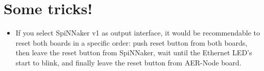 \section{Some tricks!}

\begin{itemize}
    \item If you select SpiNNaker v1 as output interface, it would be recommendable to reset both boards in a specific order: push reset button from both boards, then leave the reset button from SpiNNaker, wait until the Ethernet LED's start to blink, and finally leave the reset button from AER-Node board.
\end{itemize}{}


 

